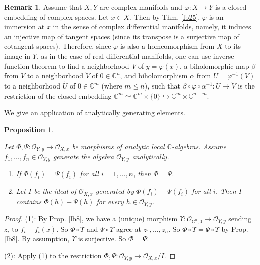 \documentclass[12pt,b5paper,notitlepage]{report}
\theoremstyle{definition}
\newtheorem{rem}[df]{Remark}
\theoremstyle{plain}
\newtheorem{pp}[df]{Proposition}
\newcommand{\wtd}{\widetilde}
\newcommand{\scr}{\mathscr}
\newcommand{\Cbb}{\mathbb C}
\numberwithin{equation}{section}
\begin{document}
\begin{rem}\label{lb191}
Assume that $X,Y$ are complex manifolds and $\varphi:X\rightarrow Y$ is a closed embedding of complex spaces. Let $x\in X$. Then by Thm. \ref{lb25},  $\varphi$ is an immersion at $x$ in the sense of complex differential manifolds, namely, it induces an injective map of tangent spaces (since its transpose is a surjective map of cotangent spaces). Therefore, since $\varphi$ is also a homeomorphism from $X$ to its image in $Y$, as in the case of real differential manifolds, one can use inverse function theorem to find a neighborhood $V$ of $y=\varphi(x)$, a  biholomorphic map $\beta$ from $V$ to a neighborhood $\wtd V$ of $0\in\Cbb^n$, and biholomorphism $\alpha$ from $U=\varphi^{-1}(V)$ to a neighborhood $\wtd U$ of $0\in\Cbb^m$ (where $m\leq n$), such that $\beta\circ\varphi\circ\alpha^{-1}:\wtd U\rightarrow\wtd V$ is the restriction of the closed embedding $\Cbb^m\simeq\Cbb^m\times\{0\}\hookrightarrow\Cbb^m\times\Cbb^{n-m}$.
\end{rem}



We give an application of analytically generating elements.


\begin{pp}\label{lb24}

\item Let $\Phi,\Psi:\scr O_{Y,y}\rightarrow\scr O_{X,x}$ be morphisms of analytic local $\Cbb$-algebras. Assume $f_1,\dots,f_n\in\scr O_{Y,y}$ generate the algebra $\scr O_{Y,y}$ analytically. 
\begin{enumerate}[label=(\arabic*)]
\item If $\Phi(f_i)=\Psi(f_i)$ for all $i=1,\dots,n$, then $\Phi=\Psi$.
\item Let $I$ be the ideal of $\scr O_{X,x}$ generated by $\Phi(f_i)-\Psi(f_i)$ for all $i$. Then $I$ contains $\Phi(h)-\Psi(h)$ for every $h\in\scr O_{Y,y}$.
\end{enumerate}
\end{pp}

\begin{proof}
(1): By Prop. \ref{lb8}, we have a (unique) morphism $\Upsilon:\scr O_{\Cbb^n,0}\rightarrow\scr O_{Y,y}$ sending $z_i$ to $f_i-f_i(x)$. So $\Phi\circ\Upsilon$ and $\Psi\circ\Upsilon$ agree at $z_1,\dots,z_n$. So $\Phi\circ\Upsilon=\Psi\circ\Upsilon$ by Prop. \ref{lb8}. By assumption, $\Upsilon$ is surjective. So $\Phi=\Psi$. 

(2): Apply (1) to the restriction $\Phi,\Psi:\scr O_{Y,y}\rightarrow\scr O_{X,x}/I$.
\end{proof}
\end{document}

